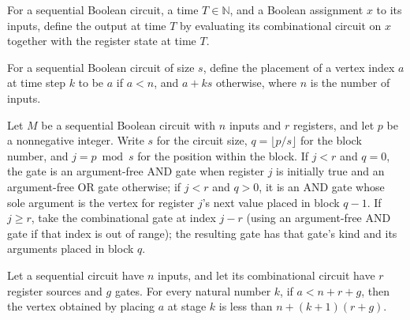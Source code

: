 \begin{definition}
\label{BoolCircuit.SeqCircuit.run}
\leanok
{}
For a sequential Boolean circuit, a time $T\in\mathbb{N}$, and a Boolean assignment $x$
to its inputs, define the output at time $T$ by evaluating its combinational circuit on
$x$ together with the register state at time $T$.
\end{definition}

\begin{definition}
\label{BoolCircuit.SeqCircuit.place}
\leanok
{}
For a sequential Boolean circuit of size $s$, define the placement of a vertex index $a$
at time step $k$ to be $a$ if $a<n$, and $a+ks$ otherwise, where $n$ is the number of
inputs.
\end{definition}

\begin{definition}
\label{BoolCircuit.SeqCircuit.unrollGate}
\leanok
{}
Let $M$ be a sequential Boolean circuit with $n$ inputs and $r$ registers, and let $p$
be a nonnegative integer. Write $s$ for the circuit size, $q=\lfloor p/s\rfloor$ for the
block number, and $j=p\bmod s$ for the position within the block. If $j<r$ and $q=0$,
the gate is an argument-free AND gate when register $j$ is initially true and an
argument-free OR gate otherwise; if $j<r$ and $q>0$, it is an AND gate whose sole
argument is the vertex for register $j$'s next value placed in block $q-1$. If $j\ge r$,
take the combinational gate at index $j-r$ (using an argument-free AND gate if that
index is out of range); the resulting gate has that gate's kind and its arguments placed
in block $q$.
\end{definition}

\begin{theorem}
\label{BoolCircuit.SeqCircuit.place_lt}
\leanok
{}
Let a sequential circuit have $n$ inputs, and let its combinational circuit have $r$
register sources and $g$ gates. For every natural number $k$, if $a<n+r+g$, then the
vertex obtained by placing $a$ at stage $k$ is less than $n+(k+1)(r+g)$.
\end{theorem}

